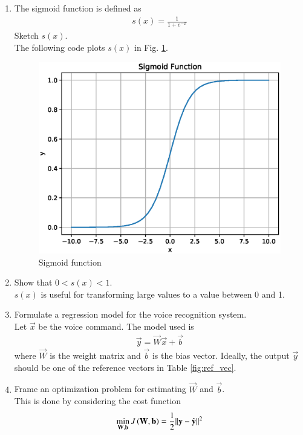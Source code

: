 \documentclass[journal,12pt,twocolumn]{IEEEtran}
\renewcommand\thesection{\arabic{section}}
\begin{document}
\begin{enumerate}[label=\thesection.\arabic*
,ref=\thesection.\theenumi]
\\
\solution See Table \ref{fig:ref_vec}.
\begin{table}[!ht]
\begin{center}

\end{center}
\caption{Reference vectors}
\label{fig:ref_vec}
\end{table}
%
\item The sigmoid function is defined as
\begin{align}
\label{eq:sig}
s(x) = \frac{1}{1+e^{-x}}
\end{align}
Sketch $s(x)$.
\\
\solution The following code plots $s(x)$ in Fig. \ref{fig:sigmoid}.
\begin{figure}[ht!]
\begin{center}
\includegraphics[width=\columnwidth]{./figs/sigmoid.eps}
\end{center}
\caption{Sigmoid function }
\label{fig:sigmoid}
\end{figure}
\item Show that $0 < s(x) < 1$.
\\
\solution $s(x)$ is useful for transforming large values to a value between 0 and 1.
\item Formulate a regression model for the voice recognition system.
\\
\solution Let $\vec{x}$ be the voice command. The model used is
\begin{align}
\label{eq:sig}
\vec{y} = \vec{W}\vec{x}+\vec{b}
\end{align}
%
where $\vec{W}$ is the weight matrix and $\vec{b}$ is the bias vector. Ideally, the output $\vec{y}$ should be one of the reference vectors in Table \ref{fig:ref_vec}.
\item Frame an optimization problem for estimating $\vec{W}$  and $\vec{b}$.
\\
\solution  This is done by considering the cost function 
\begin{equation}
\label{eq:cost}
\min_{\mathbf{W},\mathbf{b}} J\left(\mathbf{W},\mathbf{b}\right)  = \frac{1}{2}\lVert\mathbf{y}-\hat{\mathbf{y}}\rVert^2
\end{equation}


\end{enumerate}
\end{document}
